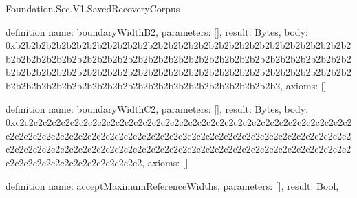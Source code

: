 \begin{lexlean}{Foundation.Sec.V1.SavedRecoveryCorpus}
\begin{semanticmodule}
definition{
  name: boundaryWidthB2,
  parameters: [],
  result: Bytes,
  body: 0xb2b2b2b2b2b2b2b2b2b2b2b2b2b2b2b2b2b2b2b2b2b2b2b2b2b2b2b2b2b2b2b2b2b2b2b2b2b2b2b2b2b2b2b2b2b2b2b2b2b2b2b2b2b2b2b2b2b2b2b2b2b2b2b2b2b2b2b2b2b2b2b2b2b2b2b2b2b2b2b2b2b2b2b2b2b2b2b2b2b2b2b2b2b2b2b2b2b2b2b2b2b2b2b2b2b2b2b2b2b2b2b2b2b2b2b2b2b2b2b2b2b2b2b2b2b2b2b2,
  axioms: []
}

definition{
  name: boundaryWidthC2,
  parameters: [],
  result: Bytes,
  body: 0xc2c2c2c2c2c2c2c2c2c2c2c2c2c2c2c2c2c2c2c2c2c2c2c2c2c2c2c2c2c2c2c2c2c2c2c2c2c2c2c2c2c2c2c2c2c2c2c2c2c2c2c2c2c2c2c2c2c2c2c2c2c2c2c2c2c2c2c2c2c2c2c2c2c2c2c2c2c2c2c2c2c2c2c2c2c2c2c2c2c2c2c2c2c2c2c2c2c2c2c2c2c2c2c2c2c2c2c2c2c2c2c2c2c2c2c2c2c2c2c2c2c2c2c2c2c2c2c2,
  axioms: []
}

definition{
  name: acceptMaximumReferenceWidths,
  parameters: [],
  result: Bool,
}
\end{semanticmodule}
\end{lexlean}
